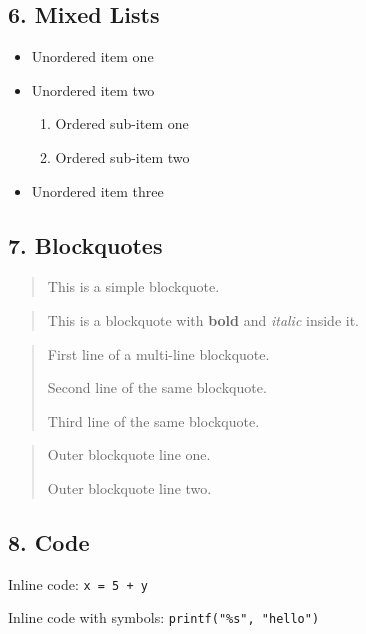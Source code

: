 \documentclass{article}
\begin{document}
\subsection{ 6. Mixed Lists}

\begin{itemize}
\item  Unordered item one
\item  Unordered item two
\begin{enumerate}
\item  Ordered sub-item one
\item  Ordered sub-item two
\end{enumerate}


\item  Unordered item three
\end{itemize}

\subsection{ 7. Blockquotes}

\begin{quote}
 This is a simple blockquote.

\end{quote}

\begin{quote}
 This is a blockquote with \textbf{bold} and \emph{italic} inside it.

\end{quote}

\begin{quote}
 First line of a multi-line blockquote.

 Second line of the same blockquote.

 Third line of the same blockquote.

\end{quote}

\begin{quote}
 Outer blockquote line one.

 Outer blockquote line two.

\end{quote}

\subsection{ 8. Code}

Inline code: \texttt{x = 5 + y}

Inline code with symbols: \texttt{printf("\%s", "hello")}
\end{document}
